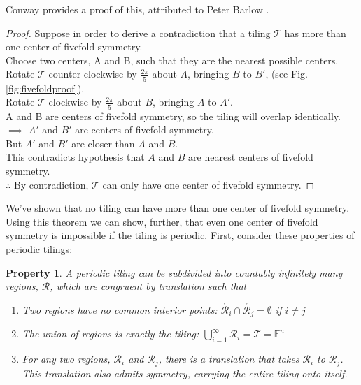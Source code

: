 \documentclass[
  oneside,
  11pt, a4paper,
  footinclude=true,
  headinclude=true,
  cleardoublepage=empty
]{scrbook}
\newtheorem{myprop}{Property}
\begin{document}
Conway provides a proof of this, attributed to Peter Barlow \cite{Gardner1997}.

\begin{proof}
Suppose in order to derive a contradiction that a tiling $\mathcal{T}$ has more than one center of fivefold symmetry.\\
Choose two centers, A and B, such that they are the nearest possible centers. \\
Rotate $\mathcal{T}$ counter-clockwise by $\frac{2\pi}{5}$ about $A$, bringing $B$ to $B'$, (see Fig.\ref{fig:fivefoldproof}).\\
Rotate $\mathcal{T}$ clockwise by $\frac{2\pi}{5}$ about $B$, bringing $A$ to $A'$.\\
A and B are centers of fivefold symmetry, so the tiling will overlap identically.\\
$\implies$ $A'$ and $B'$ are centers of fivefold symmetry.\\
But $A'$ and $B'$ are closer than $A$ and $B$.\\
This contradicts hypothesis that $A$ and $B$ are nearest centers of fivefold symmetry.\\
$\therefore$ By contradiction, $\mathcal{T}$ can only have one center of fivefold symmetry.
\end{proof}

We've shown that no tiling can have more than one center of fivefold symmetry. Using this theorem we can show, further, that even one center of fivefold symmetry is impossible if the tiling is periodic. First, consider these properties of periodic tilings:

\begin{myprop}
A periodic tiling can be subdivided into countably infinitely many regions, $\mathcal{R}$, which are congruent by translation such that
\begin{enumerate}
\item Two regions have no common interior points: $\mathring{\mathcal{R}_i} \cap  \mathring{\mathcal{R}_j}=\emptyset$ if $i\neq j$
\item The union of regions is exactly the tiling: $\bigcup_{i=1}^\infty \mathcal{R}_i = \mathcal{T}=\mathbb{E}^n$
\item For any two regions, $\mathcal{R}_i$ and $\mathcal{R}_j$, there is a translation that takes  $\mathcal{R}_i$ to $\mathcal{R}_j$. This translation also admits symmetry, carrying the entire tiling onto itself. \label{periodprop3}
\end{enumerate}
\label{periodprop}
\end{myprop}
\end{document}
